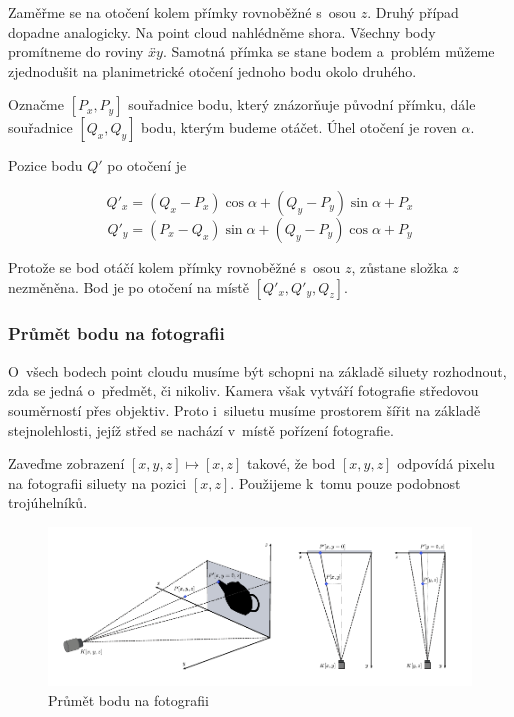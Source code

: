 \documentclass[12pt]{report}			%
\begin{document}
                        Zaměřme se na otočení kolem přímky rovnoběžné s~osou $z$. Druhý případ dopadne analogicky. Na point cloud nahlédněme shora. Všechny body promítneme do roviny $\overleftrightarrow{xy}$. Samotná přímka se stane bodem a~problém můžeme zjednodušit na planimetrické otočení jednoho bodu okolo druhého.

                        Označme $[P_x,P_y]$ souřadnice bodu, který znázorňuje původní přímku, dále souřadnice $[Q_x,Q_y]$ bodu, kterým budeme otáčet. Úhel otočení je roven $\alpha$.

                        Pozice bodu $Q'$ po otočení je

                        $$ Q'_x = (Q_x-P_x) \cos\alpha + (Q_y-P_y) \sin\alpha + P_x$$
                        $$ Q'_y = (P_x-Q_x) \sin\alpha + (Q_y-P_y) \cos\alpha + P_y$$

                        Protože se bod otáčí kolem přímky rovnoběžné s~osou $z$, zůstane složka $z$ nezměněna. Bod je po otočení na místě $[Q'_x,Q'_y,Q_z]$.

                    \subsubsection{Průmět bodu na fotografii}

                        O~všech bodech point cloudu musíme být schopni na základě siluety rozhodnout, zda se jedná o~předmět, či nikoliv. Kamera však vytváří fotografie středovou souměrností přes objektiv. Proto i~siluetu musíme prostorem šířit na základě stejnolehlosti, jejíž střed se nachází v~místě pořízení fotografie.

                        Zaveďme zobrazení $[x,y,z]\mapsto[x,z]$ takové, že bod $[x,y,z]$ odpovídá pixelu na fotografii siluety na pozici $[x,z]$. Použijeme k~tomu pouze podobnost trojúhelníků.

                        \begin{figure}[h]
                            \centering
                            \includegraphics[width=\textwidth]{images/prumet.pdf}
                            \caption{Průmět bodu na fotografii}
                        \end{figure}
\end{document}

